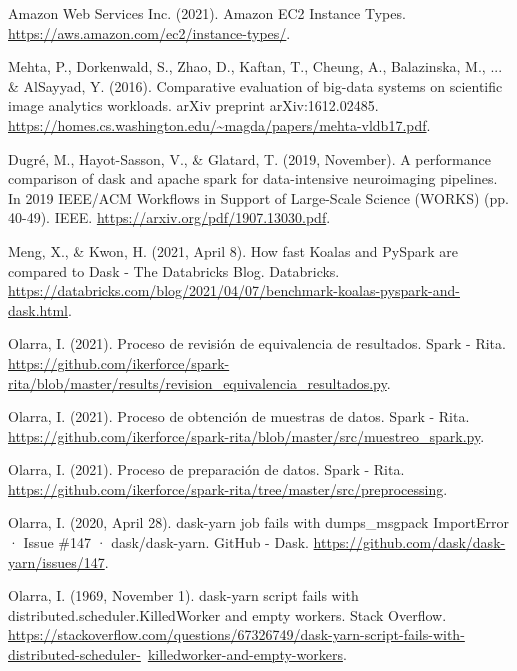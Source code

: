 \documentclass[11pt, oneside]{book}
\begin{document}
\begin{thebibliography}{111}
 Amazon Web Services Inc. (2021). Amazon EC2 Instance Types.  \url{https://aws.amazon.com/ec2/instance-types/}.

 Mehta, P., Dorkenwald, S., Zhao, D., Kaftan, T., Cheung, A., Balazinska, M., ... \& AlSayyad, Y. (2016). Comparative evaluation of big-data systems on scientific image analytics workloads. arXiv preprint arXiv:1612.02485. \url{https://homes.cs.washington.edu/~magda/papers/mehta-vldb17.pdf}. 

 Dugré, M., Hayot-Sasson, V., \& Glatard, T. (2019, November). A performance comparison of dask and apache spark for data-intensive neuroimaging pipelines. In 2019 IEEE/ACM Workflows in Support of Large-Scale Science (WORKS) (pp. 40-49). IEEE. \url{https://arxiv.org/pdf/1907.13030.pdf}.

 Meng, X., \& Kwon, H. (2021, April 8). How fast Koalas and PySpark are compared to Dask - The Databricks Blog. Databricks. \url{https://databricks.com/blog/2021/04/07/benchmark-koalas-pyspark-and-dask.html}. 

 Olarra, I. (2021). Proceso de revisión de equivalencia de resultados. Spark - Rita. \url{https://github.com/ikerforce/spark-rita/blob/master/results/revision_equivalencia_resultados.py}. 

 Olarra, I. (2021). Proceso de obtención de muestras de datos. Spark - Rita. \url{https://github.com/ikerforce/spark-rita/blob/master/src/muestreo_spark.py}.

 Olarra, I. (2021). Proceso de preparación de datos. Spark - Rita. \url{https://github.com/ikerforce/spark-rita/tree/master/src/preprocessing}.

 Olarra, I. (2020, April 28). dask-yarn job fails with dumps\_msgpack ImportError · Issue \#147 · dask/dask-yarn. GitHub - Dask. \url{https://github.com/dask/dask-yarn/issues/147}. 

 Olarra, I. (1969, November 1). dask-yarn script fails with distributed.scheduler.KilledWorker and empty workers. Stack Overflow. \url{https://stackoverflow.com/questions/67326749/dask-yarn-script-fails-with-distributed-scheduler-}\ \url{killedworker-and-empty-workers}. 





\end{thebibliography}
\end{document}
